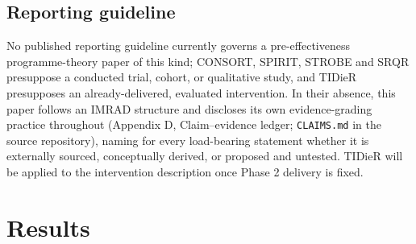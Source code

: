 \documentclass[10pt,twocolumn]{article}
\begin{document}
\subsection{Reporting guideline}
No published reporting guideline currently governs a pre-effectiveness programme-theory paper of
this kind; CONSORT, SPIRIT, STROBE and SRQR presuppose a conducted trial, cohort, or qualitative
study, and TIDieR presupposes an already-delivered, evaluated intervention. In their absence, this
paper follows an IMRAD structure and discloses its own evidence-grading practice throughout
(Appendix D, Claim--evidence ledger; \texttt{CLAIMS.md} in the source repository), naming for every
load-bearing statement whether it is externally sourced, conceptually derived, or proposed and
untested. TIDieR will be applied to the intervention description once Phase 2 delivery is fixed.

\section{Results}



\end{document}

